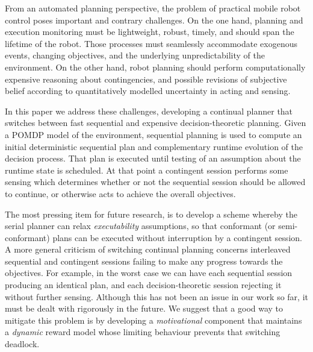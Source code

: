 

From an automated planning perspective, the problem of practical
mobile robot control poses important and contrary challenges.
On the one hand, planning and execution monitoring must be
lightweight, robust, timely, and should span the lifetime of the
robot. Those processes must seamlessly accommodate exogenous events,
changing objectives, and the underlying unpredictability of the
environment.
On the other hand, robot planning should perform computationally
expensive reasoning about contingencies, and possible revisions of
subjective belief according to quantitatively modelled uncertainty in
acting and sensing. 

In this paper we address these challenges, developing a continual
planner that switches between fast sequential and expensive
decision-theoretic planning. Given a POMDP model of the environment,
sequential planning is used to compute an initial deterministic
sequential plan and complementary runtime evolution of the decision
process. That plan is executed until testing of an assumption about
the runtime state is scheduled. At that point a contingent session
performs some sensing which determines whether or not the sequential
session should be allowed to continue, or otherwise acts to achieve
the overall objectives.


The most pressing item for future research, is to develop a scheme
whereby the serial planner can relax {\em executability} assumptions,
so that conformant (or semi-conformant) plans can be executed without
interruption by a contingent session. A more general criticism of
switching continual planning concerns interleaved sequential and
contingent sessions failing to make any progress towards the
objectives. For example, in the worst case we can have each sequential
session producing an identical plan, and each decision-theoretic
session rejecting it without further sensing. Although this has not
been an issue in our work so far, it must be dealt with rigorously
in the future. We suggest that a good way to mitigate this problem is
by developing a {\em motivational} component that maintains a {\em
dynamic} reward model whose limiting behaviour prevents that switching
deadlock.








